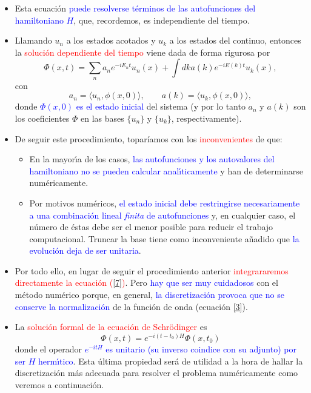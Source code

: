\documentclass[12pt]{iopart}
\def\az{\textcolor{blue}}
\def\ro{\textcolor{red}}
\begin{document}
\begin{itemize}
\item Esta ecuaci\'on \az{puede resolverse t\'erminos de las autofunciones del hamiltoniano $H$}, 
que, recordemos, es independiente del tiempo. 

\item Llamando $u_n$ a los estados acotados y 
$u_k$ a los estados del continuo, entonces la \ro{soluci\'on dependiente del tiempo} viene
dada de forma rigurosa por 
%
\begin{equation}
\Phi(x,t)=\sum_n a_n e^{-iE_n t} u_n(x) + \int dk a(k) e^{-iE(k)t} u_k(x),
\end{equation} 
con
\begin{equation}
a_n=\langle u_n,\phi(x,0)\rangle, \qquad a(k)=\langle u_k,\phi(x,0)\rangle,
\end{equation}
%
donde \az{$\Phi(x,0)$ es el estado inicial} del sistema (y por lo tanto $a_n$ y
$a(k)$ son los coeficientes $\Phi$ en las bases $\{u_n\}$ y $\{u_k\}$, respectivamente). 

\item De seguir este procedimiento, topar\'iamos con los \ro{inconvenientes} de que:
\begin{itemize}
\item En la mayor\'{\i}a de los casos, \az{las autofunciones y los autovalores del hamiltoniano no se pueden calcular
anal\'{\i}ticamente} y han de determinarse num\'ericamente.

\item Por motivos num\'ericos, \az{el estado inicial debe restringirse necesariamente a una combinaci\'on lineal
{\em finita} de autofunciones} y, en cualquier caso, el n\'umero de \'estas debe ser el menor 
posible para reducir el trabajo computacional. Truncar la base tiene como inconveniente a\~nadido
que \az{la evoluci\'on deja de ser unitaria}.
\end{itemize}

\item Por todo ello, en lugar de seguir el procedimiento anterior \ro{integrararemos directamente la ecuaci\'on (\ref{7})}.
Pero \az{hay que ser muy cuidadosos} con el m\'etodo num\'erico porque, en general, \az{la discretizaci\'on provoca que no
se conserve la normalizaci\'on} de la funci\'on de onda (ecuaci\'on \ref{3}).

\item La \ro{soluci{\'o}n formal de la ecuaci{\'o}n de Schr\"odinger} es
%
\begin{equation}
\label{evol0}
\Phi(x,t)=e^{-i(t-t_0)H} \Phi(x,t_0)
\end{equation}
%
donde el operador \az{$e^{-itH}$ es unitario (su inverso coindice con su adjunto) por ser $H$ herm{\'\i}tico}. Esta {\'u}ltima
propiedad ser{\'a} de utilidad  a la hora de hallar la discretizaci{\'o}n m{\'a}s adecuada para resolver el problema
num\'ericamente como veremos a continuaci\'on.

\end{itemize}
\end{document}
